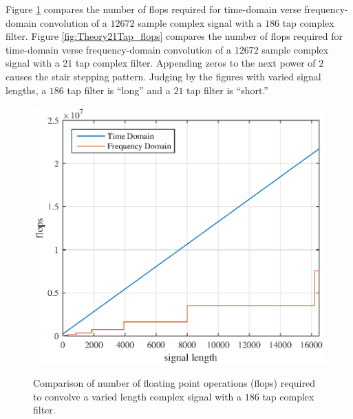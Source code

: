 Figure \ref{fig:Theory186Tap_flops} compares the number of flops required for time-domain verse frequency-domain convolution of a $12672$ sample complex signal with a $186$ tap complex filter.
Figure \ref{fig:Theory21Tap_flops} compares the number of flops required for time-domain verse frequency-domain convolution of a $12672$ sample complex signal with a $21$ tap complex filter.
Appending zeros to the next power of $2$ causes the stair stepping pattern.
Judging by the figures with varied signal lengths, a $186$ tap filter is ``long'' and a $21$ tap filter is ``short.''
\begin{figure}
	\centering\includegraphics[width=5in]{figures/gpu_intro/Theory186Tap_flops.eps}
	\label{fig:Theory186Tap_flops}
	\caption{Comparison of number of floating point operations (flops) required to convolve a varied length complex signal with a $186$ tap complex filter.}
\end{figure}
